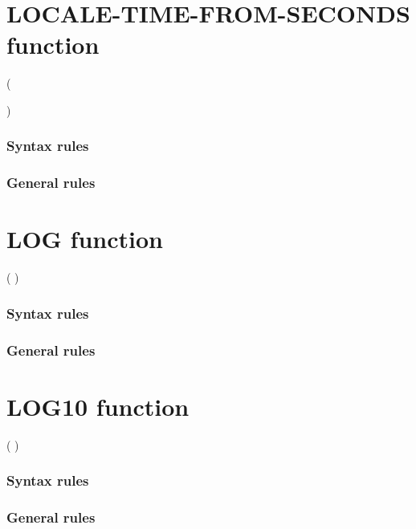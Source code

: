 \section{LOCALE-TIME-FROM-SECONDS function}

\begin{syntax}
    ( \argument
  \begin{0-1}
    \argument
  \end{0-1}
  )
\end{syntax}

\subsubsection{Syntax rules}

\subsubsection{General rules}

\section{LOG function}

\begin{syntax}
    ( \argument )
\end{syntax}

\subsubsection{Syntax rules}

\subsubsection{General rules}

\section{LOG10 function}

\begin{syntax}
    ( \argument )
\end{syntax}

\subsubsection{Syntax rules}

\subsubsection{General rules}

